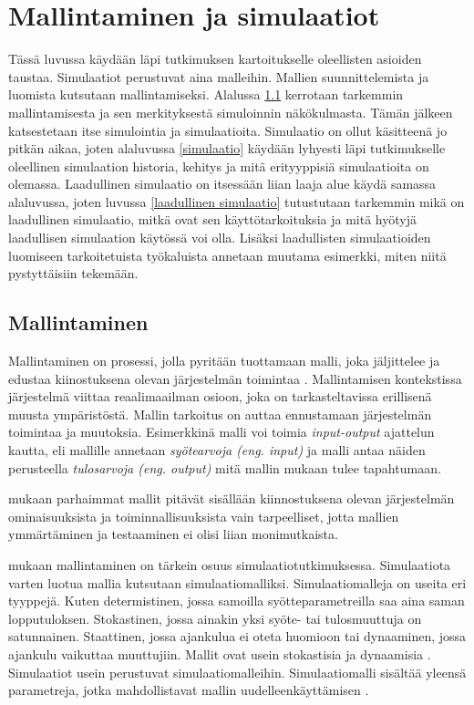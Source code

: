 \documentclass[utf8]{gradu3}
\begin{document}
\chapter{Mallintaminen ja simulaatiot}
Tässä luvussa käydään läpi tutkimuksen kartoitukselle oleellisten asioiden taustaa. 
Simulaatiot perustuvat aina malleihin. Mallien suunnittelemista ja luomista 
kutsutaan mallintamiseksi. Alalussa \ref{mallintaminen} kerrotaan tarkemmin 
mallintamisesta ja sen merkityksestä simuloinnin näkökulmasta. 
Tämän jälkeen katsestetaan itse simulointia ja simulaatioita.
Simulaatio on ollut käsitteenä jo pitkän aikaa, joten alaluvussa
\ref{simulaatio} käydään lyhyesti läpi tutkimukselle oleellinen simulaation historia, 
kehitys ja mitä erityyppisiä simulaatioita on olemassa. 
Laadullinen simulaatio on itsessään liian laaja alue käydä samassa alaluvussa, joten
luvussa \ref{laadullinen simulaatio} tutustutaan tarkemmin 
mikä on laadullinen simulaatio, mitkä ovat sen käyttötarkoituksia 
ja mitä hyötyjä laadullisen simulaation käytössä voi olla. 
Lisäksi laadullisten simulaatioiden luomiseen tarkoitetuista työkaluista annetaan 
muutama esimerkki, miten niitä pystyttäisiin tekemään.

\section{Mallintaminen} \label{mallintaminen}
Mallintaminen on prosessi, jolla pyritään tuottamaan malli, joka jäljittelee 
ja edustaa kiinostuksena olevan järjestelmän toimintaa \parencite{maria1997introduction}. 
Mallintamisen kontekstissa järjestelmä viittaa reaalimaailman osioon, 
joka on tarkasteltavissa erillisenä muusta ympäristöstä.
Mallin tarkoitus on auttaa ennustamaan järjestelmän toimintaa ja muutoksia.
Esimerkkinä malli voi toimia \textit{input-output} ajattelun kautta, 
eli mallille annetaan \textit{syötearvoja (eng. input)} ja malli antaa näiden perusteella
\textit{tulosarvoja (eng. output)} mitä mallin mukaan tulee tapahtumaan.

\textcite{maria1997introduction} mukaan parhaimmat mallit pitävät 
sisällään kiinnostuksena olevan järjestelmän 
ominaisuuksista ja toiminnallisuuksista vain tarpeelliset, 
jotta mallien ymmärtäminen ja testaaminen ei olisi liian monimutkaista.

\textcite{maria1997introduction} mukaan mallintaminen on tärkein osuus simulaatiotutkimuksessa.
Simulaatiota varten luotua mallia kutsutaan simulaatiomalliksi.
Simulaatiomalleja on useita eri tyyppejä. 
Kuten determistinen, jossa samoilla syötteparametreilla saa aina saman lopputuloksen. 
Stokastinen, jossa ainakin yksi syöte- tai tulosmuuttuja on satunnainen. 
Staattinen, jossa ajankulua ei oteta huomioon tai dynaaminen, 
jossa ajankulu vaikuttaa muuttujiin. Mallit ovat usein stokastisia ja dynaamisia \parencite{maria1997introduction}. 
Simulaatiot usein perustuvat simulaatiomalleihin. Simulaatiomalli sisältää yleensä parametreja,
jotka mahdollistavat mallin uudelleenkäyttämisen \parencite{introduction2005simulation}. 
\end{document}
